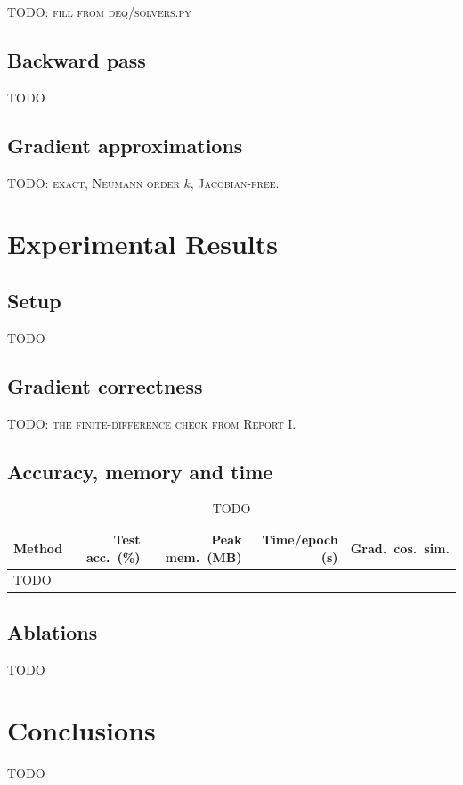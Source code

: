 \documentclass[11pt]{article}
\begin{document}
\begin{algorithm}[h]
\caption{Anderson acceleration for $\zstar = \fth(\zstar,x)$}
\label{alg:anderson}
\begin{algorithmic}[1]
  \State \textsc{TODO: fill from deq/solvers.py}
\end{algorithmic}
\end{algorithm}

\subsection{Backward pass}

\textsc{TODO}

\subsection{Gradient approximations}

\textsc{TODO: exact, Neumann order $k$, Jacobian-free.}

\section{Experimental Results}

\subsection{Setup}

\textsc{TODO}

\subsection{Gradient correctness}

\textsc{TODO: the finite-difference check from Report I.}

\subsection{Accuracy, memory and time}

\begin{table}[h]
  \centering
  \caption{\textsc{TODO}}
  \begin{tabularx}{\textwidth}{@{}Xrrrr@{}}
    \toprule
    Method & Test acc.\ (\%) & Peak mem.\ (MB) & Time/epoch (s) & Grad.\ cos.\ sim. \\
    \midrule
    \textsc{TODO} & & & & \\
    \bottomrule
  \end{tabularx}
  \label{tab:main}
\end{table}

\subsection{Ablations}

\textsc{TODO}

\section{Conclusions}

\textsc{TODO}

\printrefs
\end{document}
